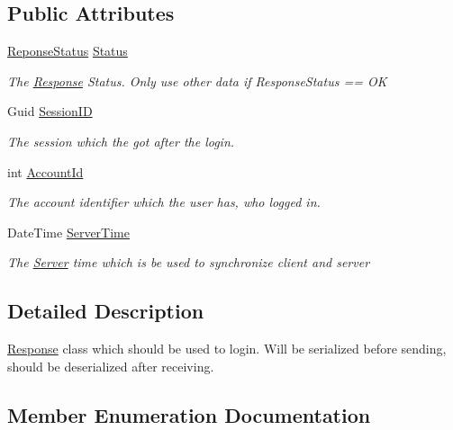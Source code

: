\subsection*{Public Attributes}
\begin{DoxyCompactItemize}
\item 
\hyperlink{classCore_1_1Connections_1_1LoginResponse_ad726169217eaad8b926b7548d43020d8}{Reponse\+Status} \hyperlink{classCore_1_1Connections_1_1LoginResponse_a07d5c565863a18dc114700d9420b2d5f}{Status}
\begin{DoxyCompactList}\small\item\em The \hyperlink{classCore_1_1Connections_1_1Response}{Response} Status. Only use other data if Response\+Status == O\+K \end{DoxyCompactList}\item 
Guid \hyperlink{classCore_1_1Connections_1_1LoginResponse_a0852c12c3db05b5f4093ee08f5aa4107}{Session\+I\+D}
\begin{DoxyCompactList}\small\item\em The session which the got after the login. \end{DoxyCompactList}\item 
int \hyperlink{classCore_1_1Connections_1_1LoginResponse_a2ef450c94ba6160627b8045a1829c1ff}{Account\+Id}
\begin{DoxyCompactList}\small\item\em The account identifier which the user has, who logged in. \end{DoxyCompactList}\item 
Date\+Time \hyperlink{classCore_1_1Connections_1_1LoginResponse_a1bb5d99f8fa2a5564fa2d7ba2d613fd0}{Server\+Time}
\begin{DoxyCompactList}\small\item\em The \hyperlink{namespaceServer}{Server} time which is be used to synchronize client and server \end{DoxyCompactList}\end{DoxyCompactItemize}


\subsection{Detailed Description}
\hyperlink{classCore_1_1Connections_1_1Response}{Response} class which should be used to login. Will be serialized before sending, should be deserialized after receiving. 



\subsection{Member Enumeration Documentation}
\hypertarget{classCore_1_1Connections_1_1LoginResponse_ad726169217eaad8b926b7548d43020d8}{}
